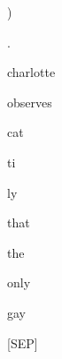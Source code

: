 \documentclass[varwidth=150mm]{standalone}
\begin{document}
\begin{CJK*}{UTF8}{gbsn}
{{{\colorbox{red!0.0}{\strut )} \colorbox{red!0.0}{\strut .} \colorbox{red!33.286865234375}{\strut charlotte} \colorbox{red!8.434525489807129}{\strut observes} \colorbox{red!1.7452149391174316}{\strut cat}\colorbox{red!5.516761779785156}{\strut ti}\colorbox{red!4.023022174835205}{\strut ly} \colorbox{red!8.697953224182129}{\strut that} \colorbox{red!0.0}{\strut the} \colorbox{red!0.0}{\strut only} \colorbox{red!40.75067138671875}{\strut gay} \colorbox{red!19.60993003845215}{\strut [SEP]}
}}}
\end{CJK*}
\end{document}
